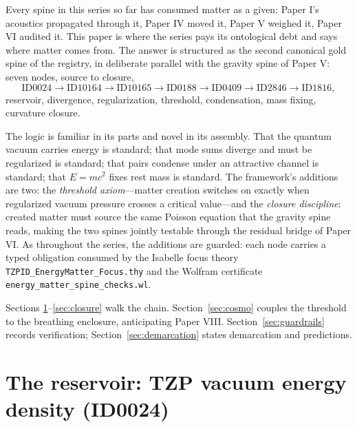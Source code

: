 \documentclass[11pt]{article}
\theoremstyle{remark}
\begin{document}
Every spine in this series so far has consumed matter as a given: Paper I's acoustics propagated through it, Paper IV moved it, Paper V weighed it, Paper VI audited it. This paper is where the series pays its ontological debt and says where matter comes from. The answer is structured as the second canonical gold spine of the registry, in deliberate parallel with the gravity spine of Paper V: seven nodes, source to closure,
\begin{equation*}
\text{ID0024} \to \text{ID10164} \to \text{ID10165} \to \text{ID0188} \to \text{ID0409} \to \text{ID2846} \to \text{ID1816},
\end{equation*}
reservoir, divergence, regularization, threshold, condensation, mass fixing, curvature closure.

The logic is familiar in its parts and novel in its assembly. That the quantum vacuum carries energy is standard; that mode sums diverge and must be regularized is standard; that pairs condense under an attractive channel is standard; that $E = mc^2$ fixes rest mass is standard. The framework's additions are two: the \emph{threshold axiom}---matter creation switches on exactly when regularized vacuum pressure crosses a critical value---and the \emph{closure discipline}: created matter must source the same Poisson equation that the gravity spine reads, making the two spines jointly testable through the residual bridge of Paper VI. As throughout the series, the additions are guarded: each node carries a typed obligation consumed by the Isabelle focus theory \texttt{TZPID\_EnergyMatter\_Focus.thy} and the Wolfram certificate \texttt{energy\_matter\_spine\_checks.wl}.

Sections \ref{sec:reservoir}--\ref{sec:closure} walk the chain. Section~\ref{sec:cosmo} couples the threshold to the breathing enclosure, anticipating Paper VIII. Section~\ref{sec:guardrails} records verification; Section~\ref{sec:demarcation} states demarcation and predictions.

\section{The reservoir: TZP vacuum energy density (ID0024)}
\label{sec:reservoir}
\end{document}
